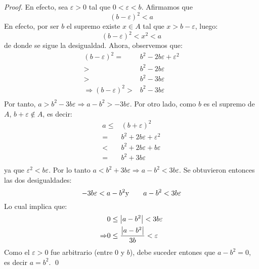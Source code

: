 \documentclass[12pt]{article}
\begin{document}
\begin{enumerate}
\begin{proof}
        En efecto, sea $\varepsilon > 0$ tal que $0<\varepsilon<b$. Afirmamos que
        \begin{equation*}
            \left(b-\varepsilon\right)^2<a
        \end{equation*}
        En efecto, por ser $b$ el supremo existe $x\in A$ tal que $x>b-\varepsilon$, luego:
        \begin{equation*}
            \left(b-\varepsilon\right)^2<x^2<a
        \end{equation*}
        de donde se sigue la desigualdad. Ahora, observemos que:
        \begin{equation*}
            \begin{split}
                \left(b-\varepsilon\right)^2=&b^2-2b\varepsilon+\varepsilon^2\\
                >&b^2-2b\varepsilon\\
                >&b^2-3b\varepsilon\\
                \Rightarrow \left(b-\varepsilon\right)^2 > &b^2-3b\varepsilon\\
            \end{split}
        \end{equation*}
        Por tanto, $a>b^2-3b\varepsilon\Rightarrow a-b^2>-3b\varepsilon$. Por otro lado, como $b$ es el supremo de $A$, $b+\varepsilon\notin A$, es decir:
        \begin{equation*}
            \begin{split}
                a \leq& (b+\varepsilon)^2\\
                =&b^2+2b\varepsilon+\varepsilon^2\\
                <&b^2+2b\varepsilon+b\varepsilon\\
                =&b^2+3b\varepsilon\\
            \end{split}
        \end{equation*}
        ya que $\varepsilon^2 < b\varepsilon$. Por lo tanto $a<b^2+3b\varepsilon\Rightarrow a-b^2<3b\varepsilon$. Se obtuvieron entonces las dos desigualdades:
        \begin{equation*}
            -3b\varepsilon<a-b^2\textup{y}\qquad a-b^2<3b\varepsilon
        \end{equation*}
        Lo cual implica que:
        \begin{equation*}
            \begin{split}
                &0\leq\left| a-b^2 \right|<3b\varepsilon\\
                \Rightarrow &0\leq \frac{\left| a-b^2 \right|}{3b}<\varepsilon
            \end{split}
        \end{equation*}
        Como el $\varepsilon>0$ fue arbitrario (entre $0$ y $b$), debe suceder entones que $a-b^2=0$, es decir $a=b^2$.
        \qed
    \end{proof}
    

\end{enumerate}
\end{document}

